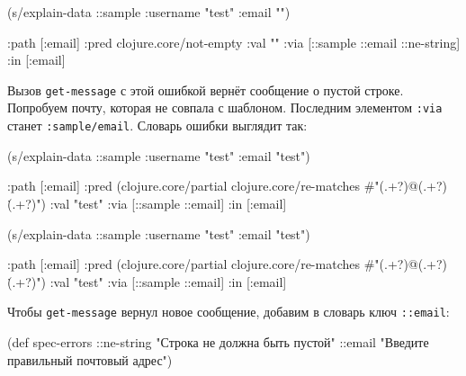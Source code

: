 \else

\begin{english}
  \begin{clojure}
(s/explain-data ::sample {:username "test" :email ""})

{:path [:email]
 :pred clojure.core/not-empty
 :val ""
 :via [::sample ::email ::ne-string]
 :in [:email]}
  \end{clojure}
\end{english}

\fi

Вызов \verb|get-message| с этой ошибкой вернёт сообщение о пустой
строке. Попробуем почту, которая не совпала с шаблоном. Последним элементом
\verb|:via| станет \verb|:sample/email|. Словарь ошибки выглядит так:

\ifx\devicetype\mobile

\begin{english}
  \begin{clojure}
(s/explain-data ::sample
  {:username "test" :email "test"})

{:path [:email]
 :pred
 (clojure.core/partial
  clojure.core/re-matches
  #"(.+?)@(.+?)\.(.+?)")
 :val "test"
 :via [::sample ::email]
 :in [:email]}
  \end{clojure}
\end{english}

\else

\begin{english}
  \begin{clojure}
(s/explain-data ::sample {:username "test" :email "test"})

{:path [:email]
 :pred
 (clojure.core/partial
  clojure.core/re-matches
  #"(.+?)@(.+?)\.(.+?)")
 :val "test"
 :via [::sample ::email]
 :in [:email]}
  \end{clojure}
\end{english}

\fi

Чтобы \verb|get-message| вернул новое сообщение, добавим в словарь ключ
\verb|::email|:

\ifx\devicetype\mobile

  \begin{clojure}
(def spec-errors
  {::ne-string
   "Строка не должна быть пустой"
   ::email
   "Введите правильный почтовый адрес"})
  \end{clojure}

\else

